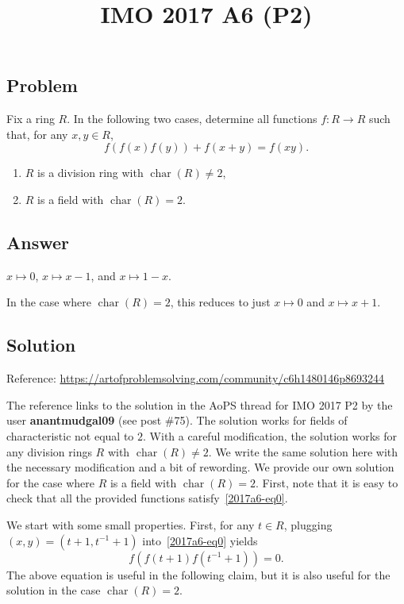 \documentclass{article}
\title{IMO 2017 A6 (P2)}
\author{}
\date{}
\DeclareMathOperator{\rchar}{char}
\begin{document}
\maketitle



\subsection*{Problem}

Fix a ring $R$.
In the following two cases, determine all functions $f : R \to R$ such that, for any $x, y \in R$,
\[ f(f(x) f(y)) + f(x + y) = f(xy). \tag{*}\label{2017a6-eq0} \]
\begin{enumerate}
    \item   $R$ is a division ring with $\rchar(R) \neq 2$,
    \item   $R$ is a field with $\rchar(R) = 2$.
\end{enumerate}


\subsection*{Answer}

$x \mapsto 0$, $x \mapsto x - 1$, and $x \mapsto 1 - x$.

In the case where $\rchar(R) = 2$, this reduces to just $x \mapsto 0$ and $x \mapsto x + 1$.



\subsection*{Solution}

Reference: \url{https://artofproblemsolving.com/community/c6h1480146p8693244}

The reference links to the solution in the AoPS thread for IMO 2017 P2 by the user \textbf{anantmudgal09} (see post \#75).
The solution works for fields of characteristic not equal to $2$.
With a careful modification, the solution works for any division rings $R$ with $\rchar(R) \neq 2$.
We write the same solution here with the necessary modification and a bit of rewording.
We provide our own solution for the case where $R$ is a field with $\rchar(R) = 2$.
First, note that it is easy to check that all the provided functions satisfy~\eqref{2017a6-eq0}.

We start with some small properties.
First, for any $t \in R$, plugging $(x, y) = (t + 1, t^{-1} + 1)$ into~\eqref{2017a6-eq0} yields
\[ f(f(t + 1) f(t^{-1} + 1)) = 0. \tag{1}\label{2017a6-eq1} \]
The above equation is useful in the following claim, but it is also useful for the solution in the case $\rchar(R) = 2$.
\end{document}
